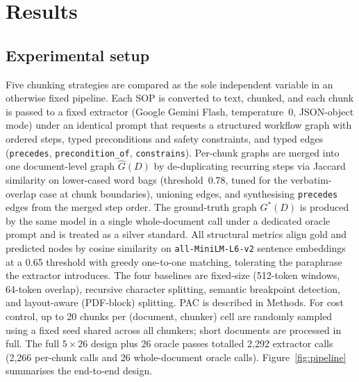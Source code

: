 \documentclass[make,article,submit,oneauthor,pdftex]{Definitions/mdpi}
\begin{document}
\section{Results}\label{sec:results}

\subsection{Experimental setup}

Five chunking strategies are compared as the sole independent variable
in an otherwise fixed pipeline. Each SOP is converted to text, chunked,
and each chunk is passed to a fixed extractor (Google
Gemini Flash\cite{gemini2023}, temperature~0, JSON-object mode)
under an identical prompt that requests a structured workflow graph
with ordered steps, typed preconditions and safety constraints, and
typed edges (\texttt{precedes}, \texttt{precondition\_of},
\texttt{constrains}). Per-chunk graphs are merged into one
document-level graph $\hat{G}(D)$ by de-duplicating recurring steps via
Jaccard similarity on lower-cased word bags (threshold~0.78, tuned for
the verbatim-overlap case at chunk boundaries), unioning edges, and
synthesising \texttt{precedes} edges from the merged step order. The ground-truth
graph $G^{*}(D)$ is produced by the same model in a single whole-document
call under a dedicated oracle prompt and is treated as a silver
standard. All structural metrics align gold and predicted nodes by
cosine similarity on \texttt{all-MiniLM-L6-v2} sentence
embeddings\cite{reimers2019sbert} at a 0.65 threshold with greedy
one-to-one matching, tolerating the paraphrase the extractor introduces.
The four baselines are fixed-size (512-token windows, 64-token overlap),
recursive character splitting, semantic breakpoint detection, and
layout-aware (PDF-block) splitting. PAC is described in Methods. For
cost control, up to 20 chunks per (document, chunker) cell are randomly
sampled using a fixed seed shared across all chunkers; short documents
are processed in full. The full $5\times26$ design plus 26
oracle passes totalled 2,292 extractor calls (2,266 per-chunk calls and
26 whole-document oracle calls). Figure~\ref{fig:pipeline} summarises
the end-to-end design.
\end{document}
